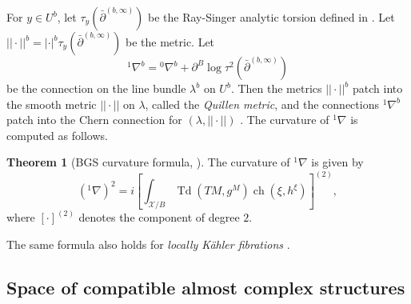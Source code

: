 \documentclass[12pt,reqno,a4paper]{amsart}
\numberwithin{equation}{section}
\DeclareMathOperator{\Td}{Td}
\DeclareMathOperator{\ch}{ch}
\theoremstyle{definition}
\newtheorem{theorem}{Theorem}
\theoremstyle{remark}
\begin{document}
For $y\in U^b$, let $\tau_y(\bar{\partial}^{(b,\infty)})$ be the Ray-Singer analytic torsion \cite{ray1973analytic} defined in \cite[Definition 1.5]{bismut1988analytic3}. Let $||\cdot||^b=|\cdot|^b \tau_y(\bar{\partial}^{(b,\infty)})$ be the metric. Let 
\begin{equation*}
{}^1\nabla^b={}^0\nabla^b+\partial^B\log \tau^2(\bar{\partial}^{(b,\infty)})
\end{equation*}
be the connection on the line bundle $\lambda^b$ on $U^b$. Then the metrics $||\cdot||^b$ patch into the smooth metric $||\cdot||$ on $\lambda$, called the \textit{Quillen metric}, and the connections ${}^1\nabla^b$ patch into the Chern connection for $(\lambda,||\cdot||)$ \cite[Theorem 1.6]{bismut1988analytic3}. The curvature of ${}^1\nabla$ is computed as follows.

\begin{theorem}[BGS curvature formula, ]
The curvature of $^1\nabla$ is given by
\begin{equation}\label{Qcurv}
\left( {}^1\nabla\right)^2=i\left[\int_{\mathcal{X}/B}\Td(TM,g^M)\ch(\xi,h^{\xi})\right]^{(2)},
\end{equation}
where $[\cdot]^{(2)}$ denotes the component of degree $2$.
\end{theorem}
The same formula also holds for \textit{locally K\"ahler fibrations} \cite[Theorem 1.27]{bismut1988analytic3}. 


\subsection{Space of compatible almost complex structures}\label{spaceof}
\end{document}

